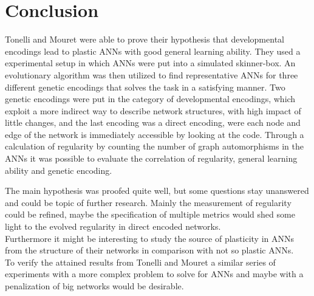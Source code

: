 \documentclass[12pt,twoside]{article}
\theoremstyle{plain}
\theoremstyle{definition}
\theoremstyle{remark}
\begin{document}
\section{Conclusion}
\label{sec:concl}

Tonelli and Mouret were able to prove their hypothesis that developmental encodings lead to plastic ANNs with good general learning ability.
They used a experimental setup in which ANNs were put into a simulated skinner-box. An evolutionary algorithm was then utilized to find representative ANNs for three different genetic encodings that solves the task in a satisfying manner.
Two genetic encodings were put in the category of developmental encodings, which exploit a more indirect way to describe network structures, with high impact of little changes, and the last encoding was a direct encoding, were each node and edge of the network is immediately accessible by looking at the code.
Through a calculation of regularity by counting the number of graph automorphisms in the ANNs it was possible to evaluate the correlation of regularity, general learning ability and genetic encoding.\medskip

The main hypothesis was proofed quite well, but some questions stay unanswered and could be topic of further research.
Mainly the measurement of regularity could be refined, maybe the specification of multiple metrics would shed some light to the evolved regularity in direct encoded networks.\\
Furthermore it might be interesting to study the source of plasticity in ANNs from the structure of their networks in comparison with not so plastic ANNs.\\
To verify the attained results from Tonelli and Mouret a similar series of experiments with a more complex problem to solve for ANNs and maybe with a penalization of big networks would be desirable.

%
%
\newpage


\end{document}
